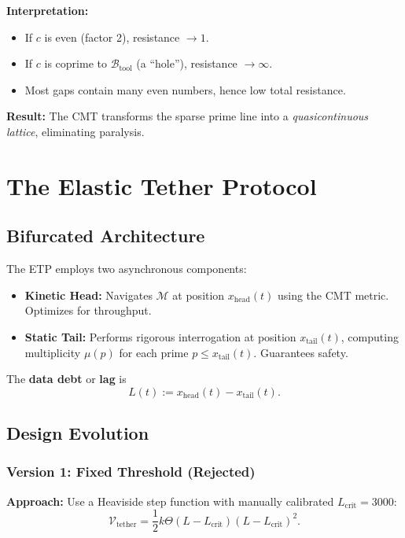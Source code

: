 \documentclass[12pt,a4paper]{article}
\begin{document}
\textbf{Interpretation:}
\begin{itemize}
\item If $c$ is even (factor 2), resistance $\to 1$.
\item If $c$ is coprime to $\mathcal{B}_{\text{tool}}$ (a ``hole''), resistance $\to \infty$.
\item Most gaps contain many even numbers, hence low total resistance.
\end{itemize}

\textbf{Result:} The CMT transforms the sparse prime line into a \textit{quasicontinuous lattice}, eliminating paralysis.

\section{The Elastic Tether Protocol}
\label{sec:etp}

\subsection{Bifurcated Architecture}

The ETP employs two asynchronous components:

\begin{itemize}
\item \textbf{Kinetic Head:} Navigates $\mathcal{M}$ at position $x_{\text{head}}(t)$ using the CMT metric. Optimizes for throughput.

\item \textbf{Static Tail:} Performs rigorous interrogation at position $x_{\text{tail}}(t)$, computing multiplicity $\mu(p)$ for each prime $p \le x_{\text{tail}}(t)$. Guarantees safety.
\end{itemize}

The \textbf{data debt} or \textbf{lag} is
\[
L(t) := x_{\text{head}}(t) - x_{\text{tail}}(t).
\]

\subsection{Design Evolution}

\subsubsection{Version 1: Fixed Threshold (Rejected)}

\textbf{Approach:} Use a Heaviside step function with manually calibrated $L_{\text{crit}} = 3000$:
\[
\mathcal{V}_{\text{tether}} = \frac{1}{2} k \Theta(L - L_{\text{crit}}) (L - L_{\text{crit}})^2.
\]
\end{document}

